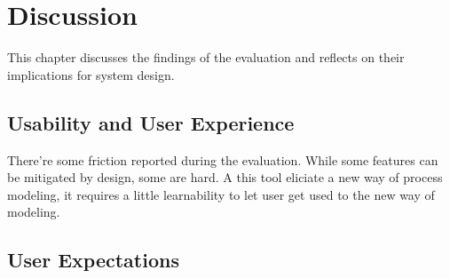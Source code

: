 \chapter{Discussion}
\label{sec:discussion}

This chapter discusses the findings of the evaluation and reflects on their implications for system design.
\section{Usability and User Experience}
There're some friction reported during the evaluation. While some features can be mitigated by design, some are hard. A this tool eliciate a new way of process modeling, it requires a little learnability to let user get used to the new way of modeling.

\section {User Expectations}

